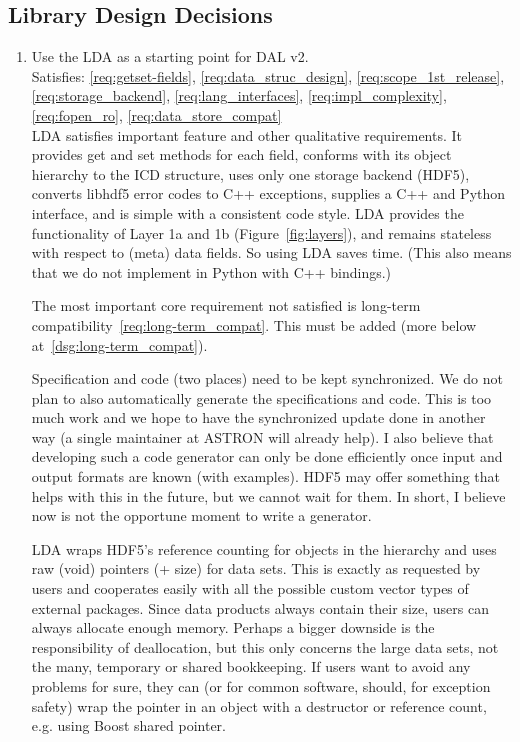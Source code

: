 \documentclass[a4paper,11pt]{article}
\begin{document}
\subsection{Library Design Decisions} \label{sec:lib_design_decisions}

\begin{enumerate}[label=\it D.\arabic{*}]
\itemsep0em

\item \label{dsg:LDA} Use the LDA as a starting point for DAL v2.\\
Satisfies: \ref{req:getset-fields}, \ref{req:data_struc_design}, \ref{req:scope_1st_release}, \ref{req:storage_backend}, \ref{req:lang_interfaces}, \ref{req:impl_complexity}, \ref{req:fopen_ro}, \ref{req:data_store_compat}\\

LDA satisfies important feature and other qualitative requirements.
It provides get and set methods for each field, conforms with its object hierarchy to the ICD structure, uses only one storage backend (HDF5), converts libhdf5 error codes to C++ exceptions, supplies a C++ and Python interface, and is simple with a consistent code style.
LDA provides the functionality of Layer 1a and 1b (Figure~\ref{fig:layers}), and remains stateless with respect to (meta) data fields.
So using LDA saves time.
(This also means that we do not implement in Python with C++ bindings.)

The most important core requirement not satisfied is long-term compatibility~\ref{req:long-term_compat}.
This must be added (more below at~\ref{dsg:long-term_compat}).

Specification and code (two places) need to be kept synchronized.
We do not plan to also automatically generate the specifications and code.
This is too much work and we hope to have the synchronized update done in another way (a single maintainer at ASTRON will already help).
I also believe that developing such a code generator can only be done efficiently once input and output formats are known (with examples).
HDF5 may offer something that helps with this in the future, but we cannot wait for them.
In short, I believe now is not the opportune moment to write a generator.

LDA wraps HDF5's reference counting for objects in the hierarchy and uses raw (void) pointers (+ size) for data sets.
This is exactly as requested by users and cooperates easily with all the possible custom vector types of external packages.
Since data products always contain their size, users can always allocate enough memory.
Perhaps a bigger downside is the responsibility of deallocation, but this only concerns the large data sets, not the many, temporary or shared bookkeeping.
If users want to avoid any problems for sure, they can (or for common software, should, for exception safety) wrap the pointer in an object with a destructor or reference count, e.g. using Boost shared pointer.


\end{enumerate}
\end{document}
